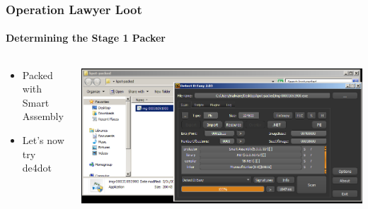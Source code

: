 \documentclass[aspectratio=169]{beamer}
\begin{document}
{
\begin{frame}
  \frametitle{Operation Lawyer Loot}
  \framesubtitle{Determining the Stage 1 Packer}
  \begin{columns}
    \begin{column}{.3\textwidth}
      \begin{itemize}
      \item{Packed with Smart Assembly}
      \item{Let's now try de4dot}
      \end{itemize}
    \end{column}
    \hfill
    \begin{column}{.7\textwidth}
      \begin{center}
        \includegraphics[scale=1.25]{kpot-unpacking-2}
      \end{center}
    \end{column}
  \end{columns}
\end{frame}
}
\end{document}
